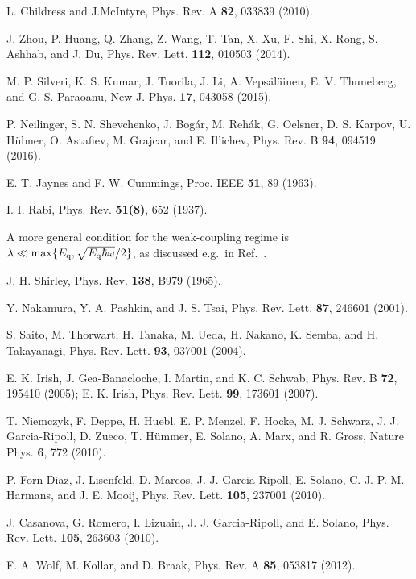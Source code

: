 \documentclass[aps,twocolumn,superscriptaddress]{revtex4}
\begin{document}
\begin{thebibliography}{99}
 L. Childress and J.McIntyre, Phys. Rev. A {\bf 82}, 033839 (2010).

 J. Zhou, P. Huang, Q. Zhang, Z. Wang, T. Tan, X. Xu, F. Shi, X. Rong, S. Ashhab, and J. Du, Phys. Rev. Lett. {\bf 112}, 010503 (2014).

 M. P. Silveri, K. S. Kumar, J. Tuorila, J. Li, A. Veps\"al\"ainen, E. V. Thuneberg, and G. S. Paraoanu, New J. Phys. {\bf 17}, 043058 (2015).

 P. Neilinger, S. N. Shevchenko, J. Bog\'ar, M. Reh\'ak, G. Oelsner, D. S. Karpov, U. H\"ubner, O. Astafiev, M. Grajcar, and E. Il'ichev, Phys. Rev. B {\bf 94}, 094519 (2016).

 E. T. Jaynes and F. W. Cummings, Proc. IEEE {\bf 51}, 89 (1963).

 I. I. Rabi, Phys. Rev. {\bf 51(8)}, 652 (1937).

 A more general condition for the weak-coupling regime is $\lambda\ll \max\{E_{\rm q},\sqrt{E_{\rm q}\hbar\omega}/2\}$, as discussed e.g.~in Ref.~\cite{Ashhab2010}.

 J. H. Shirley, Phys. Rev. {\bf 138}, B979 (1965).

 Y. Nakamura, Y. A. Pashkin, and J. S. Tsai, Phys. Rev. Lett. {\bf 87}, 246601 (2001).

 S. Saito, M. Thorwart, H. Tanaka, M. Ueda, H. Nakano, K. Semba, and H. Takayanagi, Phys. Rev. Lett. {\bf 93}, 037001 (2004).

 E. K. Irish, J. Gea-Banacloche, I. Martin, and K. C. Schwab, Phys. Rev. B {\bf 72}, 195410 (2005); E. K. Irish, Phys. Rev. Lett. {\bf 99}, 173601 (2007).

 T. Niemczyk, F. Deppe, H. Huebl, E. P. Menzel, F. Hocke, M. J. Schwarz, J. J. Garcia-Ripoll, D. Zueco, T. H\"ummer, E. Solano, A. Marx, and R. Gross, Nature Phys. {\bf 6}, 772 (2010).

 P. Forn-Diaz, J. Lisenfeld, D. Marcos, J. J. Garcia-Ripoll, E. Solano, C. J. P. M. Harmans, and J. E. Mooij, Phys. Rev. Lett. {\bf 105}, 237001 (2010).

 J. Casanova, G. Romero, I. Lizuain, J. J. Garcia-Ripoll, and E. Solano, Phys. Rev. Lett. {\bf 105}, 263603 (2010).

 F. A. Wolf, M. Kollar, and D. Braak, Phys. Rev. A {\bf 85}, 053817 (2012).


\end{thebibliography}
\end{document}
